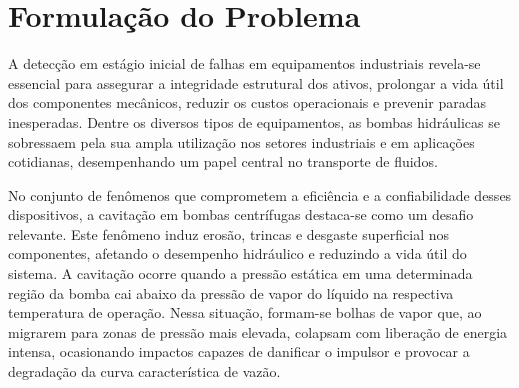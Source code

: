 \section{Formulação do Problema}

A detecção em estágio inicial de falhas em equipamentos industriais revela-se essencial para assegurar a integridade estrutural dos ativos, prolongar a vida útil dos componentes mecânicos, reduzir os custos operacionais e prevenir paradas inesperadas. Dentre os diversos tipos de equipamentos, as bombas hidráulicas se sobressaem pela sua ampla utilização nos setores industriais e em aplicações cotidianas, desempenhando um papel central no transporte de fluidos.

No conjunto de fenômenos que comprometem a eficiência e a confiabilidade desses dispositivos, a cavitação em bombas centrífugas destaca-se como um desafio relevante. Este fenômeno induz erosão, trincas e desgaste superficial nos componentes, afetando o desempenho hidráulico e reduzindo a vida útil do sistema. A cavitação ocorre quando a pressão estática em uma determinada região da bomba cai abaixo da pressão de vapor do líquido na respectiva temperatura de operação. Nessa situação, formam-se bolhas de vapor que, ao migrarem para zonas de pressão mais elevada, colapsam com liberação de energia intensa, ocasionando impactos capazes de danificar o impulsor e provocar a degradação da curva característica de vazão.

